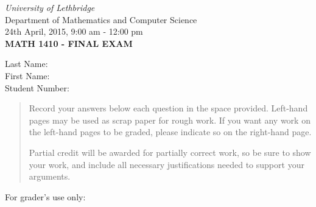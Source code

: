 \documentclass[12pt]{article}
\newcommand{\skipline}{\vspace{12pt}}
\begin{document}
\author{Instructor: Sean Fitzpatrick}
\thispagestyle{plain}
\begin{center}
\emph{University of Lethbridge}\\
Department of Mathematics and Computer Science\\
24th April, 2015, 9:00 am - 12:00 pm\\
{\bf MATH 1410 - FINAL EXAM}\\
\end{center}
\skipline \skipline \skipline \noindent \skipline
Last Name:\underline{\hspace{350pt}}\\
\skipline
First Name:\underline{\hspace{348pt}}\\
\skipline
Student Number:\underline{\hspace{322pt}}\\
\skipline

\vspace{0.5in}


\begin{quote}

 
 Record your answers below each question in the space provided.    Left-hand pages may be used as scrap paper for rough work.  If you want any work on the left-hand pages to be graded, please indicate so on the right-hand page.
 
 \bigskip
 
Partial credit will be awarded for partially correct work, so be sure to show your work, and include all necessary justifications needed to support your arguments. 

\bigskip

\end{quote}


\vspace{0.25in}

For grader's use only:
\end{document}
